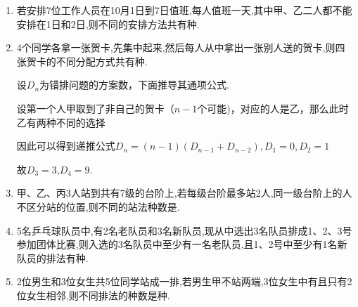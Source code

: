\begin{enumerate}

\item 若安排7位工作人员在10月1日到7日值班,每人值班一天,其中甲、乙二人都不能安排在1日和2日,则不同的安排方法共有种.

\item 4个同学各拿一张贺卡,先集中起来,然后每人从中拿出一张别人送的贺卡,则四张贺卡的不同分配方式共有种.
\begin{jieda}
    设$D_n$为错排问题的方案数，下面推导其通项公式.

    设第一个人甲取到了非自己的贺卡（$n-1$个可能)，对应的人是乙，那么此时乙有两种不同的选择
    因此可以得到递推公式$D_n=(n-1)(D_{n-1}+D_{n-2}),D_1=0,D_2=1$

    故$D_3=3$,$D_4=9$.
\end{jieda}

\item 甲、乙、丙3人站到共有7级的台阶上,若每级台阶最多站2人,同一级台阶上的人不区分站的位置,则不同的站法种数是.

\item 5名乒乓球队员中,有2名老队员和3名新队员,现从中选出3名队员排成1、2、3号参加团体比赛,则入选的3名队员中至少有一名老队员,且1、2号中至少有1名新队员的排法有种.
\begin{jieda}
\end{jieda}

\item 2位男生和3位女生共5位同学站成一排,若男生甲不站两端,3位女生中有且只有2位女生相邻,则不同排法的种数是种.
\begin{jieda}
\end{jieda}
\end{enumerate}
